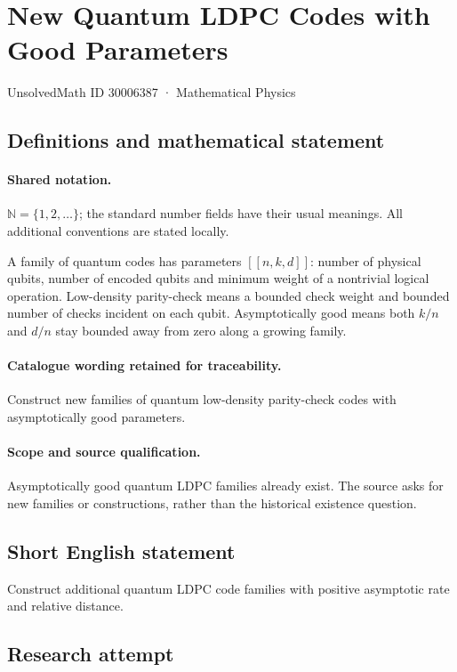 \documentclass[11pt]{article}
\begin{document}
\setcounter{section}{30006386}
\section{New Quantum LDPC Codes with Good Parameters}\label{30006387}
{\small UnsolvedMath ID 30006387 · Mathematical Physics}
\subsection{Definitions and mathematical statement}

\paragraph{Shared notation.}$\mathbb N=\{1,2,\ldots\}$; the standard number fields have their usual meanings. All additional conventions are stated locally.


A family of quantum codes has parameters $[[n,k,d]]$: number of physical qubits, number of encoded qubits and minimum weight of a nontrivial logical operation. Low-density parity-check means a bounded check weight and bounded number of checks incident on each qubit. Asymptotically good means both $k/n$ and $d/n$ stay bounded away from zero along a growing family.

\paragraph{Catalogue wording retained for traceability.}
Construct new families of quantum low-density parity-check codes with asymptotically good parameters.

\paragraph{Scope and source qualification.}Asymptotically good quantum LDPC families already exist. The source asks for new families or constructions, rather than the historical existence question.
\subsection{Short English statement}
Construct additional quantum LDPC code families with positive asymptotic rate and relative distance.
\subsection{Research attempt}
\end{document}
